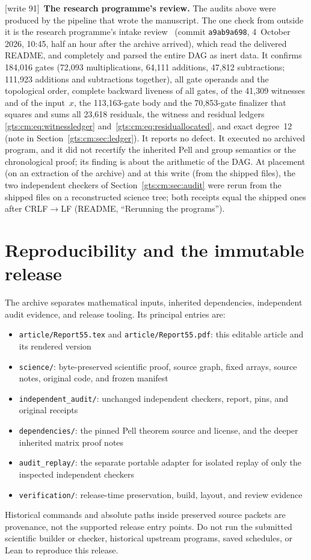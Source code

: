 \documentclass[11pt,letterpaper]{article}
\theoremstyle{definition}
\theoremstyle{remark}
\newcommand{\wtagd}{\textup{[write 91]}}
\begin{document}
\wtagd\ \textbf{The research programme's review.} The audits above were produced by the pipeline that wrote the manuscript. The one check from outside it is the research programme's intake review~\cite{repo-revcm} (commit \texttt{a9ab9a698}, 4~October 2026, 10:45, half an hour after the archive arrived), which read the delivered README,  and  completely and parsed the entire DAG as inert data. It confirms 184,016 gates (72,093 multiplications, 64,111 additions, 47,812 subtractions; 111,923 additions and subtractions together), all gate operands and the topological order, complete backward liveness of all gates, of the 41,309 witnesses and of the input~$x$, the 113,163-gate body and the 70,853-gate finalizer that squares and sums all 23,618 residuals, the witness and residual ledgers \eqref{gts:cm:eq:witnessledger} and~\eqref{gts:cm:eq:residuallocated}, and exact degree~12 (note in Section~\ref{gts:cm:sec:ledger}). It reports no defect. It executed no archived program, and it did not recertify the inherited Pell and group semantics or the chronological proof; its finding is about the arithmetic of the DAG. At placement (on an extraction of the archive) and at this write (from the shipped files), the two independent checkers of Section~\ref{gts:cm:sec:audit} were rerun from the shipped files on a reconstructed science tree; both receipts equal the shipped ones after CRLF$\to$LF (README, ``Rerunning the programs'').

\section{Reproducibility and the immutable release}
\label{gts:cm:sec:repro}
The archive separates mathematical inputs, inherited dependencies, independent audit evidence, and release tooling. Its principal entries are:
\begin{itemize}
\item \texttt{article/Report55.tex} and \texttt{article/Report55.pdf}: this editable article and its rendered version
\item \texttt{science/}: byte-preserved scientific proof, source graph, fixed arrays, source notes, original code, and frozen manifest
\item \texttt{independent\_audit/}: unchanged independent checkers, report, pins, and original receipts
\item \texttt{dependencies/}: the pinned Pell theorem source and license, and the deeper inherited matrix proof notes
\item \texttt{audit\_replay/}: the separate portable adapter for isolated replay of only the inspected independent checkers
\item \texttt{verification/}: release-time preservation, build, layout, and review evidence
\end{itemize}
Historical commands and absolute paths inside preserved source packets are provenance, not the supported release entry points. Do not run the submitted scientific builder or checker, historical upstream programs, saved schedules, or Lean to reproduce this release.
\end{document}
